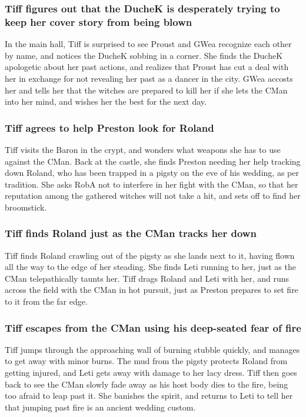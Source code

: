 \subsubsection{\Gls{Tiff} figures out that the \Gls{DucheK} is desperately trying to keep her
    cover story from being blown}
In the main hall, \Gls{Tiff} is surprised to see \Gls{Proust} and \Gls{GWea} recognize each other by
name, and notices the \Gls{DucheK} sobbing in a corner. She finds the \Gls{DucheK} apologetic about
her past actions, and realizes that \Gls{Proust} has cut a deal with her in exchange for not
revealing her past as a dancer in the city. \Gls{GWea} accosts her and tells her that the witches
are prepared to kill her if she lets the \Gls{CMan} into her mind, and wishes her the best for the
next day.

\subsubsection{\Gls{Tiff} agrees to help \Gls{Preston} look for \Gls{Roland}}
\Gls{Tiff} visits the \Gls{Baron} in the crypt, and wonders what weapons she has to use against
the \Gls{CMan}. Back at the castle, she finds \Gls{Preston} needing her help tracking down
\Gls{Roland}, who has been trapped in a pigsty on the eve of his wedding, as per tradition. She
asks \Gls{RobA} not to interfere in her fight with the \Gls{CMan}, so that her reputation among the
gathered witches will not take a hit, and sets off to find her broomstick.

\subsubsection{\Gls{Tiff} finds \Gls{Roland} just as the \Gls{CMan} tracks her down}
\Gls{Tiff} finds \Gls{Roland} crawling out of the pigsty as she lands next to it, having flown all
the way to the edge of her steading. She finds \Gls{Leti} running to her, just as the \Gls{CMan}
telepathically taunts her. \Gls{Tiff} drags \Gls{Roland} and \Gls{Leti} with her, and runs across
the field with the \Gls{CMan} in hot pursuit, just as \Gls{Preston} prepares to set fire to it from
the far edge.

\subsubsection{\Gls{Tiff} escapes from the \Gls{CMan} using his deep-seated fear of fire}
\Gls{Tiff} jumps through the approaching wall of burning stubble quickly, and manages to get away
with minor burns. The mud from the pigsty protects \Gls{Roland} from getting injured, and \Gls{Leti}
gets away with damage to her lacy dress. \Gls{Tiff} then goes back to see the \Gls{CMan} slowly
fade away as his host body dies to the fire, being too afraid to leap past it. She banishes the
spirit, and returns to \Gls{Leti} to tell her that jumping past fire is an ancient wedding custom.

